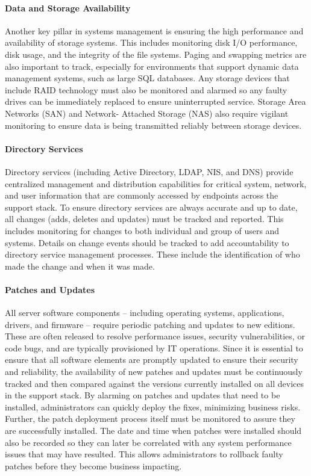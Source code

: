 \documentclass[8pt]{extarticle}
\begin{document}
\begin{multicols}{3}
\paragraph{Data and Storage Availability}
Another key pillar in systems management is ensuring the high performance and availability of
storage systems. This includes monitoring disk I/O performance, disk usage, and the integrity of the
file systems. Paging and swapping metrics are also important to track, especially for environments
that support dynamic data management systems, such as large SQL databases. Any storage devices
that include RAID technology must also be monitored and alarmed so any faulty drives can be
immediately replaced to ensure uninterrupted service. Storage Area Networks (SAN) and Network-
Attached Storage (NAS) also require vigilant monitoring to ensure data is being transmitted reliably
between storage devices.

\paragraph{Directory Services} 
Directory services (including Active Directory, LDAP, NIS, and DNS) provide centralized management
and distribution capabilities for critical system, network, and user information that are commonly
accessed by endpoints across the support stack. To ensure directory services are always accurate and
up to date, all changes (adds, deletes and updates) must be tracked and reported. This includes
monitoring for changes to both individual and group of users and systems. Details on change events
should be tracked to add accountability to directory service management processes. These include the
identification of who made the change and when it was made.

\paragraph{Patches and Updates}
All server software components – including operating systems, applications, drivers, and firmware –
require periodic patching and updates to new editions. These are often released to resolve performance
issues, security vulnerabilities, or code bugs, and are typically provisioned by IT operations. Since
it is essential to ensure that all software elements are promptly updated to ensure their security and
reliability, the availability of new patches and updates must be continuously tracked and then compared
against the versions currently installed on all devices in the support stack. By alarming on patches and
updates that need to be installed, administrators can quickly deploy the fixes, minimizing business
risks. Further, the patch deployment process itself must be monitored to assure they are successfully
installed. The date and time when patches were installed should also be recorded so they can later
be correlated with any system performance issues that may have resulted. This allows administrators
to rollback faulty patches before they become business impacting.


\end{multicols}
\end{document}
